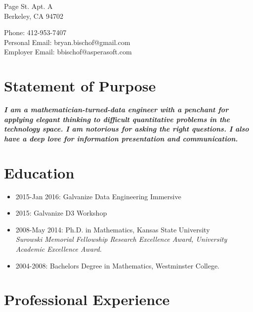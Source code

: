 \documentclass[a4paper,10pt,notitlepage]{article}
\begin{document}
\begin{multicols}{2}{
 Page St. Apt. A\\
Berkeley, CA 94702

\noindent Phone: 412-953-7407\\
Personal Email: bryan.bischof@gmail.com\\
Employer Email: bbischof@asperasoft.com
}
\end{multicols}

\vspace{-10pt}\section*{Statement of Purpose}
\noindent \textit{\textbf{I am a mathematician-turned-data engineer with a penchant for applying elegant thinking to difficult quantitative problems in the technology space. I am notorious for asking the right questions. I also have a deep love for information presentation and communication. }}


\vspace{-10pt}\section*{Education}
\begin{itemize}
	\vspace{-5pt}\item	2015-Jan 2016: Galvanize Data Engineering Immersive 
	\vspace{-5pt}\item	2015: Galvanize D3 Workshop
	\vspace{-5pt}\item	2008-May 2014: Ph.D. in Mathematics, Kansas State University\\ \textit{Surowski Memorial Fellowship Research Excellence Award, University Academic Excellence Award.}
	\vspace{-5pt}\item	2004-2008: Bachelors Degree in Mathematics, Westminster College.
\end{itemize}

\vspace{-10pt}\section*{Professional Experience}
\end{document}
